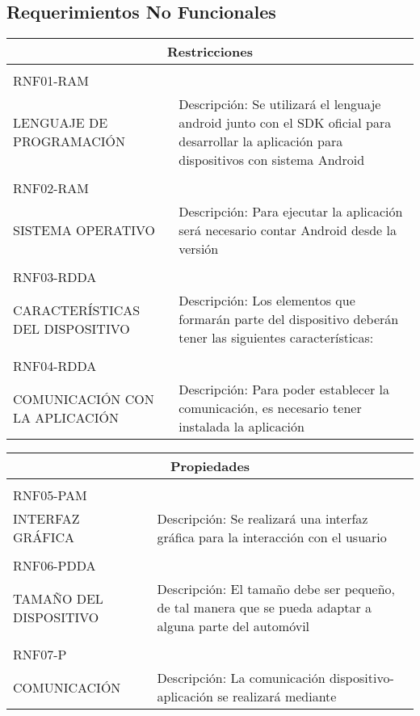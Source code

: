 \subsection{Requerimientos No Funcionales} 
  
  \begin{center}
   \begin{tabular}{|p{5.5cm}|p{7cm}|}
     \hline
     \multicolumn{2}{|c|}{Restricciones} \\ \hline
     \\ RNF01-RAM \\ LENGUAJE DE PROGRAMACIÓN & Descripción: Se utilizará el lenguaje android junto con el SDK oficial para desarrollar la aplicación para dispositivos con sistema Android \\ \hline
   \\RNF02-RAM \\ SISTEMA OPERATIVO & Descripción: Para ejecutar la aplicación será necesario contar Android desde la versión \\ \hline
  \\RNF03-RDDA \\ CARACTERÍSTICAS DEL DISPOSITIVO & Descripción: Los elementos que formarán parte del dispositivo deberán tener las siguientes características: \\ \hline
  \\RNF04-RDDA \\ COMUNICACIÓN CON LA APLICACIÓN & Descripción: Para poder establecer la comunicación, es necesario tener instalada la aplicación \\ \hline
   \end{tabular}
 \end{center}  


  
    \begin{center}
   \begin{tabular}[b]{| p{5.5cm} | p{7cm} |}
     \hline
     \multicolumn{2}{|c|}{Propiedades} \\ \hline
    \\ RNF05-PAM \\ INTERFAZ GRÁFICA & Descripción: Se realizará una interfaz gráfica para la interacción con el usuario \\ \hline \\RNF06-PDDA \\ TAMAÑO DEL DISPOSITIVO & Descripción: El tamaño debe ser pequeño, de tal manera que se pueda adaptar a alguna parte del automóvil \\ \hline
  \\RNF07-P \\ COMUNICACIÓN & Descripción: La comunicación dispositivo-aplicación se realizará mediante \\ \hline
   \end{tabular}
 \end{center}

